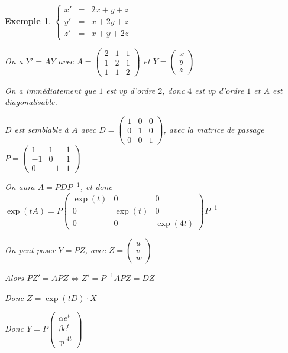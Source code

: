 \documentclass[a4paper,12pt]{book}
\newtheorem{Exe}{Exemple}[section]
\begin{document}
\begin{Exe}
$\left\{\begin{array}{rcl} x' & = & 2x+y+z \\ y' &=&x+2y+z \\ z'& = & x+y+2z\end{array}\right.$
\par On a $Y'=AY$ avec $A=\begin{pmatrix} 2 & 1 & 1 \\ 1 & 2 & 1 \\ 1 & 1 & 2\end{pmatrix}$ et $Y=\begin{pmatrix} x \\ y\\ z\end{pmatrix}$
\par On a immédiatement que $1$ est vp d'ordre $2$, donc $4$ est vp d'ordre $1$ et $A$ est diagonalisable.
\par $D$ est semblable à $A$ avec $D = \begin{pmatrix} 1 & 0 & 0 \\ 0&1&0 \\ 0&0&1\end{pmatrix}$, avec la matrice de passage $P=\begin{pmatrix} 1 & 1 & 1 \\ -1 & 0 & 1\\ 0 & -1 & 1\end{pmatrix}$
\par On aura $A = PDP^{-1}$, et donc $\exp(tA) = P\begin{pmatrix} \exp(t) & 0 & 0 \\ 0 & \exp(t) & 0 \\ 0 & 0 & \exp(4t)\end{pmatrix}P^{-1}$
\par On peut poser $Y = PZ$, avec $Z = \begin{pmatrix} u \\ v\\ w\end{pmatrix}$
\par Alors $PZ' = APZ \Leftrightarrow Z' = P^{-1}APZ = DZ$
\par Donc $Z = \exp(tD)\cdot X$
\par Donc $Y = P\begin{pmatrix} \alpha e^t \\ \beta e^t \\ \gamma e^{4t}\end{pmatrix}$
\end{Exe}
\end{document}

